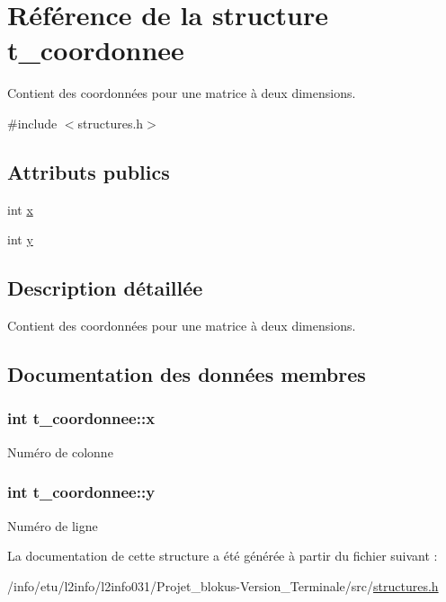 \hypertarget{structt__coordonnee}{}\section{Référence de la structure t\+\_\+coordonnee}
\label{structt__coordonnee}


Contient des coordonnées pour une matrice à deux dimensions.  




{\ttfamily \#include $<$structures.\+h$>$}

\subsection*{Attributs publics}
\begin{DoxyCompactItemize}
\item 
int \hyperlink{structt__coordonnee_adc43d2ee9bc8331939123bf7f019a5f6}{x}
\item 
int \hyperlink{structt__coordonnee_a59976d5ac64eac95bdbe12b4453f1af3}{y}
\end{DoxyCompactItemize}


\subsection{Description détaillée}
Contient des coordonnées pour une matrice à deux dimensions. 

\subsection{Documentation des données membres}
\subsubsection[{\texorpdfstring{x}{x}}]{\setlength{\rightskip}{0pt plus 5cm}int t\+\_\+coordonnee\+::x}\hypertarget{structt__coordonnee_adc43d2ee9bc8331939123bf7f019a5f6}{}\label{structt__coordonnee_adc43d2ee9bc8331939123bf7f019a5f6}
Numéro de colonne 
\subsubsection[{\texorpdfstring{y}{y}}]{\setlength{\rightskip}{0pt plus 5cm}int t\+\_\+coordonnee\+::y}\hypertarget{structt__coordonnee_a59976d5ac64eac95bdbe12b4453f1af3}{}\label{structt__coordonnee_a59976d5ac64eac95bdbe12b4453f1af3}
Numéro de ligne 

La documentation de cette structure a été générée à partir du fichier suivant \+:\begin{DoxyCompactItemize}
\item 
/info/etu/l2info/l2info031/\+Projet\+\_\+blokus-\/\+Version\+\_\+\+Terminale/src/\hyperlink{structures_8h}{structures.\+h}\end{DoxyCompactItemize}
